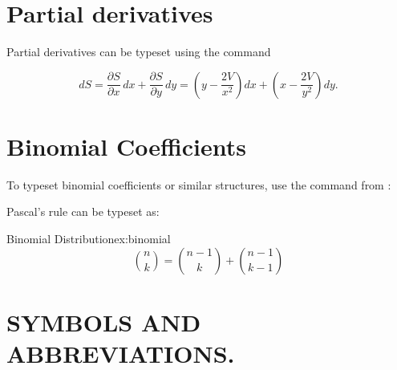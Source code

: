 \section{Partial derivatives}

Partial derivatives can be typeset using the \latex{} command 

\begin{texexample}{}{}

\[
dS = \frac{\partial S}{\partial x}\, dx
   + \frac{\partial S}{\partial y}\, dy
   = \left(y - \frac{2V}{x^2}\right) dx
   + \left(x - \frac{2V}{y^2}\right) dy.
\]
\end{texexample}




\section{Binomial Coefficients}

To typeset binomial coefficients or similar structures, use the command
 from :

Pascal's rule can be typeset as:


\begin{texexample}{Binomial Distribution}{ex:binomial}
\[
\binom{n}{k} =\binom{n-1}{k}
+ \binom{n-1}{k-1}
\]
\end{texexample}



\section[SYMBOLS AND ABBREVIATIONS.]{SYMBOLS AND ABBREVIATIONS.}

\label{abbr}\label{symbols}%

\newlength{\dentwidth}\setlength{\dentwidth}{\textwidth}
\addtolength{\dentwidth}{-\parindent}


 \def\Par{%
   \mathchoice
      {\@parallelogram\scriptsize}%
      {\@parallelogram\scriptsize}%
      {\@parallelogram\tiny}%
      {\@parallelogram\tiny}}
\def\@parallelogram#1{%
  \textnormal{\setbox\z@\hbox{#1/}\dimen@\wd\z@
   \@tempdima 2.45\dimen@
   \vbox{\offinterlineskip
      \hbox{\kern.8\dimen@\vrule\@width\@tempdima\@height.4\p@}%
      \kern-.0\p@
      \hbox to\@tempdima{#1/\hfil\rlap/}%
      \kern-.5\p@
      \hbox{\kern.1\dimen@\vrule\@width\@tempdima\@height.4\p@}}}}


